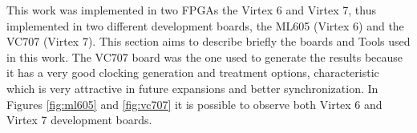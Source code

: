 This work was implemented in two FPGAs the Virtex 6 and Virtex 7, thus
implemented in two different development boards, the ML605 (Virtex 6) and the
VC707 (Virtex 7). This section aims to describe briefly the boards and Tools used in
this work. The VC707 board was the one used to generate the results because it
has a very good clocking generation and treatment options, characteristic which
is very attractive in future expansions and better synchronization. In Figures
\ref{fig:ml605} and \ref{fig:vc707} it is possible to observe both Virtex 6 and
Virtex 7 development boards.



%


